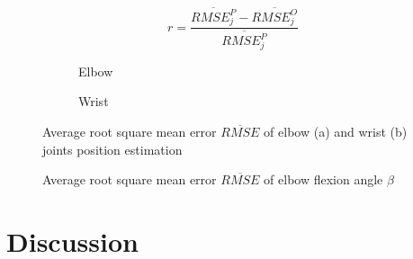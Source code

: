 \documentclass[sensors,article,submit,moreauthors,pdftex,10pt,a4paper]{mdpi}
\begin{document}
	\begin{equation}
		r = \frac{\overline{RMSE^P_j} - \overline{RMSE^O_j}}{\overline{RMSE^P_j}}
		\label{eq:results:comparison}
	\end{equation}
		
	\begin{figure}[H]
		\centering
		\begin{subfigure}[b]{0.49\textwidth}
			\centering
			
			\caption{Elbow}
			\label{fig:results:positionError:a}
		\end{subfigure} \hfill
		\begin{subfigure}[b]{0.49\textwidth}
			\centering
			
			\caption{Wrist}
			\label{fig:results:positionError:b}
		\end{subfigure}
		\caption{Average root square mean error $\overline{RMSE}$ of elbow (a) and wrist (b) joints position estimation}
		\label{fig:results:positionError}
	\end{figure}   
		
	\begin{figure}[H]
		\centering
		
		\caption{Average root square mean error $\overline{RMSE}$ of elbow flexion angle $\beta$}
		\label{fig:results:elbowAngleError}
	\end{figure}
		
	\section{Discussion}
		
\end{document}
